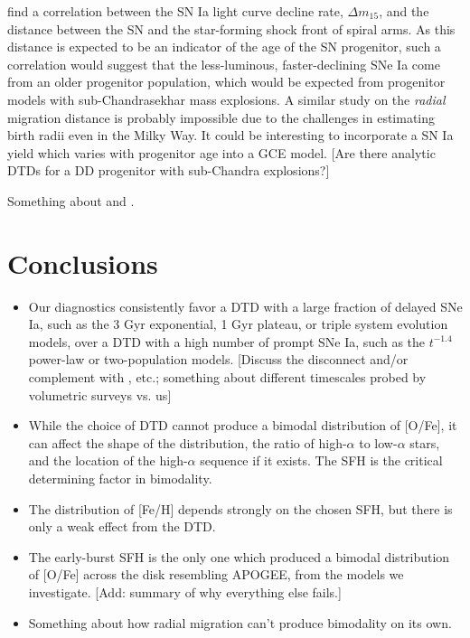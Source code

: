 \documentclass[twocolumn,twocolappendix,linenumbers,trackchanges]{aastex631}
\begin{document}
\citet{Karapetyan2022-SNIaDistances} find a correlation between the SN Ia light curve decline rate, $\Delta m_{15}$, and the distance between the SN and the star-forming shock front of spiral arms. As this distance is expected to be an indicator of the age of the SN progenitor, such a correlation would suggest that the less-luminous, faster-declining SNe Ia come from an older progenitor population, which would be expected from progenitor models with sub-Chandrasekhar mass explosions. A similar study on the {\it radial} migration distance is probably impossible due to the challenges in estimating birth radii even in the Milky Way. It could be interesting to incorporate a SN Ia yield which varies with progenitor age into a GCE model.
[Are there analytic DTDs for a DD progenitor with sub-Chandra explosions?]

Something about  and \citet{Schonrich2009-RadialMixing}.

\section{Conclusions}
\label{sec:conclusions}

\begin{itemize}

    \item Our diagnostics consistently favor a DTD with a large fraction of delayed SNe Ia, such as the 3 Gyr exponential, 1 Gyr plateau, or triple system evolution models, over a DTD with a high number of prompt SNe Ia, such as the $t^{-1.4}$ power-law or two-population models. [Discuss the disconnect and/or complement with \citet{Maoz2017-CosmicDTD}, etc.; something about different timescales probed by volumetric surveys vs. us]
    
    \item While the choice of DTD cannot produce a bimodal distribution of [O/Fe], it can affect the shape of the distribution, the ratio of high-$\alpha$ to low-$\alpha$ stars, and the location of the high-$\alpha$ sequence if it exists. The SFH is the critical determining factor in bimodality.

    \item The distribution of [Fe/H] depends strongly on the chosen SFH, but there is only a weak effect from the DTD.

    \item The early-burst SFH is the only one which produced a bimodal distribution of [O/Fe] across the disk resembling APOGEE, from the models we investigate. [Add: summary of why everything else fails.]

    \item Something about how radial migration can't produce bimodality on its own.
    
\end{itemize}
\end{document}

